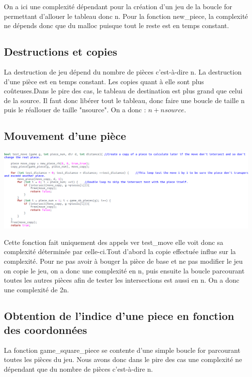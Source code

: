\documentclass{article}
\begin{document}
On a ici une complexité dépendant pour la création d'un jeu de la boucle for permettant d'allouer le tableau donc n.
Pour la fonction new\_piece, la complexité ne dépends donc que du malloc puisque tout le reste est en temps constant. 

\subsection{Destructions et copies}

La destruction de jeu dépend du nombre de pièces c'est-à-dire n. La destruction d'une pièce est en temps constant.
Les copies quant à elle sont plus coûteuses.Dans le pire des cas, le tableau de destination est plus grand que celui de la source. Il faut donc libérer tout le tableau, donc faire une boucle de taille n puis le réallouer de taille "nsource". On a donc : $n + nsource$.

\subsection{Mouvement d'une pièce}

\begin{flushleft}
\includegraphics[scale=0.35]{playmove.png}
\end{flushleft}


Cette fonction fait uniquement des appels ver test\_move elle voit donc sa complexité déterminée par celle-ci.Tout d'abord la copie effectuée influe sur la complexité. Pour ne pas avoir à bouger la pièce de base et ne pas modifier le jeu on copie le jeu, on a donc une complexité en n, puis ensuite la boucle parcourant toutes les autres pièces afin de tester les intersections est aussi en n. On a donc une complexité de 2n.
\subsection{Obtention de l'indice d'une piece en fonction des coordonnées}

La fonction game\_square\_piece se contente d'une simple boucle for parcourant toutes les pièces du jeu. Nous avons donc dans le pire des cas une complexité ne dépendant que du nombre de pièces c'est-à-dire n.
\end{document}
